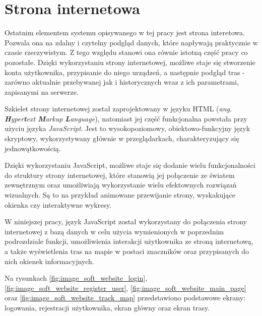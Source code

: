 \section{Strona internetowa}
\lstset{language=HTML, inputencoding=utf8, breaklines=true}

Ostatnim elementem systemu opisywanego w tej pracy jest strona interetowa. Pozwala ona na zdalny i czytelny podgląd danych, które napływają praktycznie w czasie rzeczywistym. Z tego względu stanowi ona równie istotną część pracy co pozostałe. Dzięki wykorzystaniu strony internetowej, możliwe staje się stworzenie konta użytkownika, przypisanie do niego urządzeń, a następnie podgląd tras - zarówno aktualnie przebywanej jak i historycznych wraz z ich parametrami, zapisanymi na serwerze.

Szkielet strony internetowej został zaprojektowany w języku HTML (\textit{ang. \textbf{H}yper\textbf{t}ext \textbf{M}arkup \textbf{L}anguage}), natomiast jej część funkcjonalna powstała przy użyciu języka \textit{JavaScript}. Jest to wysokopoziomowy, obiektowo-funkcyjny język skryptowy, wykorzystywany głównie w przeglądarkach, charakteryzujący się jednowątkowością.

Dzięki wykorzystaniu JavaScript, możliwe staje się dodanie wielu funkcjonalności do struktury strony internetowej, które stanowią jej połączenie ze światem zewnętrznym oraz umożliwiają wykorzystanie wielu efektownych rozwiązań wizualnych. Są to na przykład animowane przewijanie strony, wyskakujące okienka czy interaktywne wykresy.

W niniejszej pracy, język JavaScript został wykorzystany do połączenia strony internetowej z bazą danych w celu użycia wymienionych w poprzednim podrozdziale funkcji, umożliwienia interakcji użytkownika ze stroną internetową, a także wyświetlenia tras na mapie w postaci znaczników oraz przypisanych do nich okienek informacyjnych.  

Na rysunkach \ref{fig:image_soft_website_login}, \ref{fig:image_soft_website_register_user}, \ref{fig:image_soft_website_main_page} oraz \ref{fig:image_soft_website_track_map} przedstawiono podstawowe ekrany: logowania, rejestracji użytkownika, ekran główny oraz ekran trasy.

